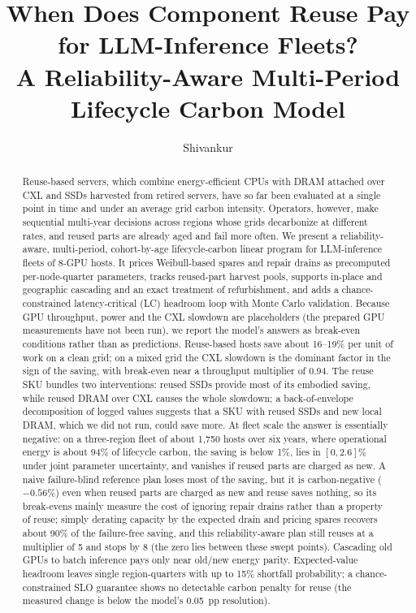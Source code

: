 \documentclass{article} %
\title{When Does Component Reuse Pay for LLM-Inference Fleets? \\ A Reliability-Aware Multi-Period Lifecycle Carbon Model}
\author{Shivankur}
\begin{document}
\maketitle
{}

\begin{abstract}
Reuse-based servers, which combine energy-efficient CPUs with DRAM attached over CXL and SSDs harvested from retired servers, have so far been evaluated at a single point in time and under an average grid carbon intensity. Operators, however, make sequential multi-year decisions across regions whose grids decarbonize at different rates, and reused parts are already aged and fail more often. We present a reliability-aware, multi-period, cohort-by-age lifecycle-carbon linear program for LLM-inference fleets of 8-GPU hosts. It prices Weibull-based spares and repair drains as precomputed per-node-quarter parameters, tracks reused-part harvest pools, supports in-place and geographic cascading and an exact treatment of refurbishment, and adds a chance-constrained latency-critical (LC) headroom loop with Monte Carlo validation. Because GPU throughput, power and the CXL slowdown are placeholders (the prepared GPU measurements have not been run), we report the model's answers as break-even conditions rather than as predictions. Reuse-based hosts save about 16--19\% per unit of work on a clean grid; on a mixed grid the CXL slowdown is the dominant factor in the sign of the saving, with break-even near a throughput multiplier of 0.94. The reuse SKU bundles two interventions: reused SSDs provide most of its embodied saving, while reused DRAM over CXL causes the whole slowdown; a back-of-envelope decomposition of logged values suggests that a SKU with reused SSDs and new local DRAM, which we did not run, could save more. At fleet scale the answer is essentially negative: on a three-region fleet of about 1,750 hosts over six years, where operational energy is about 94\% of lifecycle carbon, the saving is below 1\%, lies in $[0, 2.6]\%$ under joint parameter uncertainty, and vanishes if reused parts are charged as new. A naive failure-blind reference plan loses most of the saving, but it is carbon-negative ($-0.56\%$) even when reused parts are charged as new and reuse saves nothing, so its break-evens mainly measure the cost of ignoring repair drains rather than a property of reuse; simply derating capacity by the expected drain and pricing spares recovers about 90\% of the failure-free saving, and this reliability-aware plan still reuses at a multiplier of 5 and stops by 8 (the zero lies between these swept points). Cascading old GPUs to batch inference pays only near old/new energy parity. Expected-value headroom leaves single region-quarters with up to 15\% shortfall probability; a chance-constrained SLO guarantee shows no detectable carbon penalty for reuse (the measured change is below the model's 0.05~pp resolution).
\end{abstract}
\end{document}
